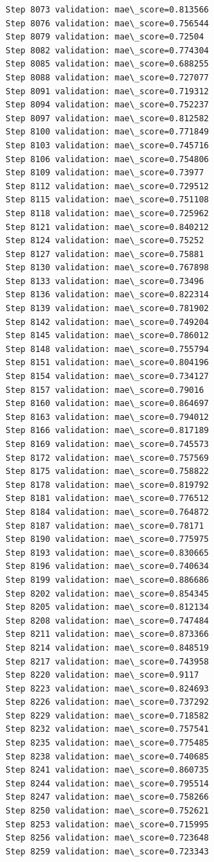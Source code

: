 \documentclass[11pt]{article}
\begin{document}
\begin{Verbatim}[commandchars=\\\{\}]
Step 8073 validation: mae\_score=0.813566
Step 8076 validation: mae\_score=0.756544
Step 8079 validation: mae\_score=0.72504
Step 8082 validation: mae\_score=0.774304
Step 8085 validation: mae\_score=0.688255
Step 8088 validation: mae\_score=0.727077
Step 8091 validation: mae\_score=0.719312
Step 8094 validation: mae\_score=0.752237
Step 8097 validation: mae\_score=0.812582
Step 8100 validation: mae\_score=0.771849
Step 8103 validation: mae\_score=0.745716
Step 8106 validation: mae\_score=0.754806
Step 8109 validation: mae\_score=0.73977
Step 8112 validation: mae\_score=0.729512
Step 8115 validation: mae\_score=0.751108
Step 8118 validation: mae\_score=0.725962
Step 8121 validation: mae\_score=0.840212
Step 8124 validation: mae\_score=0.75252
Step 8127 validation: mae\_score=0.75881
Step 8130 validation: mae\_score=0.767898
Step 8133 validation: mae\_score=0.73496
Step 8136 validation: mae\_score=0.822314
Step 8139 validation: mae\_score=0.781902
Step 8142 validation: mae\_score=0.749204
Step 8145 validation: mae\_score=0.786012
Step 8148 validation: mae\_score=0.755794
Step 8151 validation: mae\_score=0.804196
Step 8154 validation: mae\_score=0.734127
Step 8157 validation: mae\_score=0.79016
Step 8160 validation: mae\_score=0.864697
Step 8163 validation: mae\_score=0.794012
Step 8166 validation: mae\_score=0.817189
Step 8169 validation: mae\_score=0.745573
Step 8172 validation: mae\_score=0.757569
Step 8175 validation: mae\_score=0.758822
Step 8178 validation: mae\_score=0.819792
Step 8181 validation: mae\_score=0.776512
Step 8184 validation: mae\_score=0.764872
Step 8187 validation: mae\_score=0.78171
Step 8190 validation: mae\_score=0.775975
Step 8193 validation: mae\_score=0.830665
Step 8196 validation: mae\_score=0.740634
Step 8199 validation: mae\_score=0.886686
Step 8202 validation: mae\_score=0.854345
Step 8205 validation: mae\_score=0.812134
Step 8208 validation: mae\_score=0.747484
Step 8211 validation: mae\_score=0.873366
Step 8214 validation: mae\_score=0.848519
Step 8217 validation: mae\_score=0.743958
Step 8220 validation: mae\_score=0.9117
Step 8223 validation: mae\_score=0.824693
Step 8226 validation: mae\_score=0.737292
Step 8229 validation: mae\_score=0.718582
Step 8232 validation: mae\_score=0.757541
Step 8235 validation: mae\_score=0.775485
Step 8238 validation: mae\_score=0.740685
Step 8241 validation: mae\_score=0.860735
Step 8244 validation: mae\_score=0.795514
Step 8247 validation: mae\_score=0.758266
Step 8250 validation: mae\_score=0.752621
Step 8253 validation: mae\_score=0.715995
Step 8256 validation: mae\_score=0.723648
Step 8259 validation: mae\_score=0.723343

\end{Verbatim}
\end{document}
